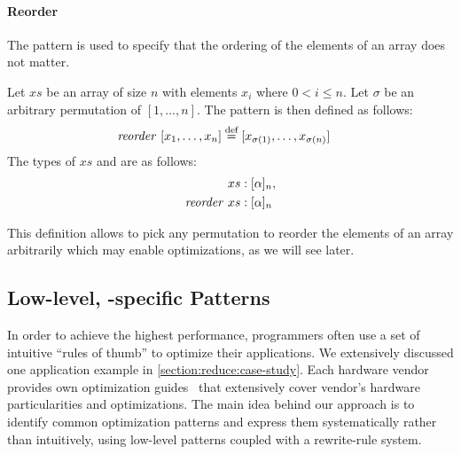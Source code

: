 
\paragraph{Reorder}
The \reorder pattern is used to specify that the ordering of the elements of an array does not matter.

\begin{definition}
  \label{definition:pattern:reorder}
  Let $xs$ be an array of size $n$ with elements $x_i$ where $0 < i \leq n$.
  Let $\sigma$ be an arbitrary permutation of $[1,\ldots, n]$.
  The \reorder pattern is then defined as follows:
  \begin{align*}
    \text{\textit{reorder}}\ [x_1, \ldots, x_n] &\stackrel{\textrm{\scriptsize def}}{=} [x_{\sigma(1)}, \ldots, x_{\sigma(n)}]
  \end{align*}
  The types of $xs$ and \reorder are as follows:
  \begin{align*}
    xs &: [\alpha]_n,\\
    \text{\textit{reorder}}\ xs &: [\alpha]_n
  \end{align*}
\end{definition}

\noindent
This definition allows to pick any permutation to reorder the elements of an array arbitrarily which may enable optimizations, as we will see later.





\subsection{Low-level, \OpenCL-specific Patterns}

In order to achieve the highest performance, programmers often use a set of intuitive ``rules of thumb'' to optimize their applications.
We extensively discussed one application example in \autoref{section:reduce:case-study}.
Each hardware vendor provides own optimization guides~\cite{CUDAProgrammingGuide,AMDProgrammingGuide,IntelGPUProgrammingGuide,IntelXeonProgrammingGuide} that extensively cover vendor's hardware particularities and optimizations.
The main idea behind our approach is to identify common optimization patterns and express them systematically rather than intuitively, using low-level patterns coupled with a rewrite-rule system.

